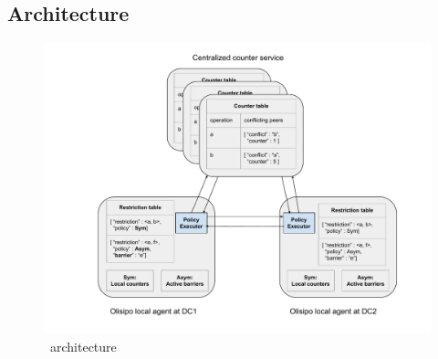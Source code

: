 \subsection{Architecture}
\label{sec:tool}
\begin{figure}[t!]
\centering
\includegraphics[width=\columnwidth]{./figures/tool_support.pdf}
\caption{\coordtool\ architecture}
\label{fig:tooldesign}
\end{figure}

